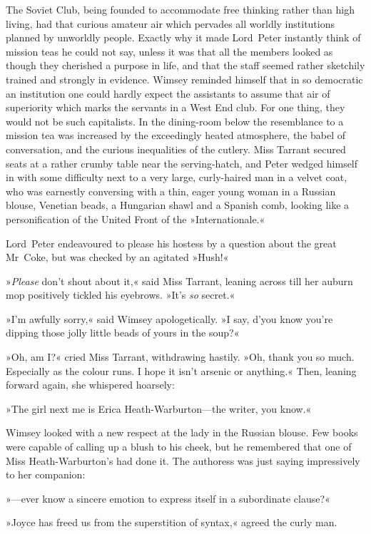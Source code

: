 The Soviet Club, being founded to accommodate free thinking rather than high living, had that curious amateur air which pervades all worldly institutions planned by unworldly people. Exactly why it made Lord~Peter instantly think of mission teas he could not say, unless it was that all the members looked as though they cherished a purpose in life, and that the staff seemed rather sketchily trained and strongly in evidence. Wimsey reminded himself that in so democratic an institution one could hardly expect the assistants to assume that air of superiority which marks the servants in a West End club. For one thing, they would not be such capitalists. In the dining-room below the resemblance to a mission tea was increased by the exceedingly heated atmosphere, the babel of conversation, and the curious inequalities of the cutlery. Miss Tarrant secured seats at a rather crumby table near the serving-hatch, and Peter wedged himself in with some difficulty next to a very large, curly-haired man in a velvet coat, who was earnestly conversing with a thin, eager young woman in a Russian blouse, Venetian beads, a Hungarian shawl and a Spanish comb, looking like a personification of the United Front of the »Internationale.«

Lord~Peter endeavoured to please his hostess by a question about the great Mr~Coke, but was checked by an agitated »Hush!«

»\textit{Please} don't shout about it,« said Miss Tarrant, leaning across till her auburn mop positively tickled his eyebrows. »It's \textit{so} secret.«

»I'm awfully sorry,« said Wimsey apologetically. »I say, d'you know you're dipping those jolly little beads of yours in the soup?«

»Oh, am I?« cried Miss Tarrant, withdrawing hastily. »Oh, thank you so much. Especially as the colour runs. I hope it isn't arsenic or anything.« Then, leaning forward again, she whispered hoarsely:

»The girl next me is Erica Heath-Warburton—the writer, you know.«

Wimsey looked with a new respect at the lady in the Russian blouse.  Few books were capable of calling up a blush to his cheek, but he remembered that one of Miss Heath-Warburton's had done it. The authoress was just saying impressively to her companion:

»—ever know a sincere emotion to express itself in a subordinate clause?«

»Joyce has freed us from the superstition of syntax,« agreed the curly man.

